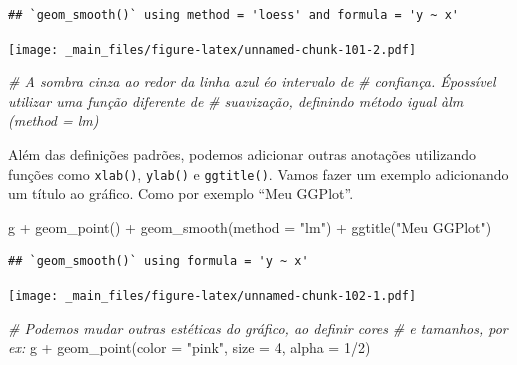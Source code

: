\documentclass[
]{book}
\newenvironment{Shaded}{\begin{snugshade}}{\end{snugshade}}
\newcommand{\AttributeTok}[1]{\textcolor[rgb]{0.77,0.63,0.00}{#1}}
\newcommand{\CommentTok}[1]{\textcolor[rgb]{0.56,0.35,0.01}{\textit{#1}}}
\newcommand{\DecValTok}[1]{\textcolor[rgb]{0.00,0.00,0.81}{#1}}
\newcommand{\FunctionTok}[1]{\textcolor[rgb]{0.00,0.00,0.00}{#1}}
\newcommand{\NormalTok}[1]{#1}
\newcommand{\SpecialCharTok}[1]{\textcolor[rgb]{0.00,0.00,0.00}{#1}}
\newcommand{\StringTok}[1]{\textcolor[rgb]{0.31,0.60,0.02}{#1}}
\begin{document}
\begin{verbatim}
## `geom_smooth()` using method = 'loess' and formula = 'y ~ x'
\end{verbatim}

\texttt{[image: \_main\_files/figure-latex/unnamed-chunk-101-2.pdf]}

\begin{Shaded}
\begin{Highlighting}[]
\CommentTok{\# A sombra cinza ao redor da linha azul éo intervalo de}
\CommentTok{\# confiança. Épossível utilizar uma função diferente de}
\CommentTok{\# suavização, definindo método igual àlm (method = \textquotesingle{}lm\textquotesingle{})}
\end{Highlighting}
\end{Shaded}

Além das definições padrões, podemos adicionar outras anotações utilizando funções como \texttt{xlab()}, \texttt{ylab()} e \texttt{ggtitle()}. Vamos fazer um exemplo adicionando um título ao gráfico. Como por exemplo ``Meu GGPlot''.

\begin{Shaded}
\begin{Highlighting}[]
\NormalTok{g }\SpecialCharTok{+} \FunctionTok{geom\_point}\NormalTok{() }\SpecialCharTok{+} \FunctionTok{geom\_smooth}\NormalTok{(}\AttributeTok{method =} \StringTok{"lm"}\NormalTok{) }\SpecialCharTok{+} \FunctionTok{ggtitle}\NormalTok{(}\StringTok{"Meu GGPlot"}\NormalTok{)}
\end{Highlighting}
\end{Shaded}

\begin{verbatim}
## `geom_smooth()` using formula = 'y ~ x'
\end{verbatim}

\texttt{[image: \_main\_files/figure-latex/unnamed-chunk-102-1.pdf]}

\begin{Shaded}
\begin{Highlighting}[]
\CommentTok{\# Podemos mudar outras estéticas do gráfico, ao definir cores}
\CommentTok{\# e tamanhos, por ex:}
\NormalTok{g }\SpecialCharTok{+} \FunctionTok{geom\_point}\NormalTok{(}\AttributeTok{color =} \StringTok{"pink"}\NormalTok{, }\AttributeTok{size =} \DecValTok{4}\NormalTok{, }\AttributeTok{alpha =} \DecValTok{1}\SpecialCharTok{/}\DecValTok{2}\NormalTok{)}
\end{Highlighting}
\end{Shaded}
\end{document}
